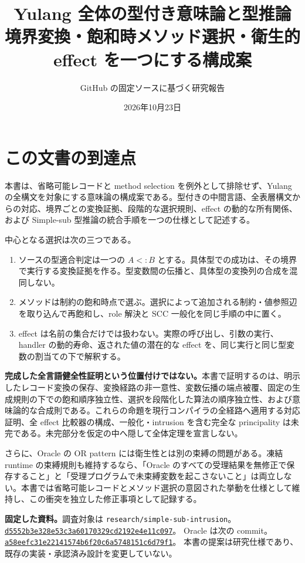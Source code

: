 \documentclass[11pt,a4paper]{article}
\title{Yulang 全体の型付き意味論と型推論\\[.5em]\large 境界変換・飽和時メソッド選択・衛生的 effect を一つにする構成案}
\author{GitHub の固定ソースに基づく研究報告}
\date{2026年10月23日}
\theoremstyle{remark}
\begin{document}
\maketitle

\section*{この文書の到達点}

本書は、省略可能レコードと method selection を例外として排除せず、Yulang の全構文を対象にする意味論の構成案である。型付きの中間言語、全表層構文からの対応、境界ごとの変換証拠、段階的な選択規則、effect の動的な所有関係、および Simple-sub 型推論の統合手順を一つの仕様として記述する。

中心となる選択は次の三つである。
\begin{enumerate}
\item ソースの型適合判定は一つの $A<:B$ とする。具体型での成功は、その境界で実行する変換証拠を作る。型変数間の伝播と、具体型の変換列の合成を混同しない。
\item メソッドは制約の飽和時点で選ぶ。選択によって追加される制約・値参照辺を取り込んで再飽和し、role 解決と SCC 一般化を同じ手順の中に置く。
\item effect は名前の集合だけでは扱わない。実際の呼び出し、引数の実行、handler の動的寿命、返された値の潜在的な effect を、同じ実行と同じ型変数の割当ての下で解釈する。
\end{enumerate}

\textbf{完成した全言語健全性証明という位置付けではない。}本書で証明するのは、明示したレコード変換の保存、変換経路の非一意性、変数伝播の端点被覆、固定の生成規則の下での飽和順序独立性、選択を段階化した算法の順序独立性、および意味論的な合成則である。これらの命題を現行コンパイラの全経路へ適用する対応証明、全 effect 比較器の構成、一般化・intrusion を含む完全な principality は未完である。未完部分を仮定の中へ隠して全体定理を宣言しない。

さらに、Oracle の OR pattern には衛生性とは別の束縛の問題がある。凍結 runtime の束縛規則も維持するなら、「Oracle のすべての受理結果を無修正で保存すること」と「受理プログラムで未束縛変数を起こさないこと」は両立しない。本書では省略可能レコードとメソッド選択の意図された挙動を仕様として維持し、この衝突を独立した修正事項として記録する。

\textbf{固定した資料。}調査対象は \texttt{research/simple-sub-intrusion}。\\
\href{https://github.com/momota1029/yulang/tree/d5552b3e328e53c3a60170329cd2192e4e11c097}{\texttt{d5552b3e328e53c3a60170329cd2192e4e11c097}}。
Oracle は次の commit。\\
\href{https://github.com/momota1029/yulang/tree/a58eefc31e22141574b6f20c6a5748151c6d79f1}{\texttt{a58eefc31e22141574b6f20c6a5748151c6d79f1}}。
本書の提案は研究仕様であり、既存の実装・承認済み設計を変更していない。
\end{document}
